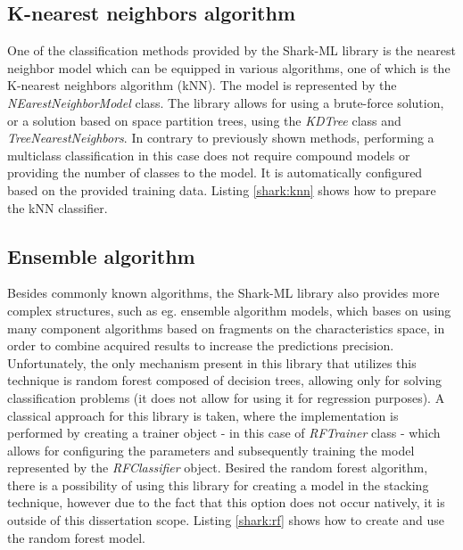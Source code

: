 
\subsection{K-nearest neighbors algorithm}

One of the classification methods provided by the Shark-ML library is the nearest neighbor model which can be equipped in various algorithms, one of which is the K-nearest neighbors algorithm (kNN). The model is represented by the 
\textit{NEarestNeighborModel} class. The library allows for using a brute-force solution, or a solution based on space partition trees, using the \textit{KDTree} class and \textit{TreeNearestNeighbors}. In contrary to previously shown methods, performing a multiclass classification in this case does not require compound models or providing the number of classes to the model. It is automatically configured based on the provided training data. Listing \ref{shark:knn} shows how to prepare the kNN classifier. 


\subsection{Ensemble algorithm}

Besides commonly known algorithms, the Shark-ML library also provides more complex structures, such as eg. ensemble algorithm models, which bases on using many component algorithms based on fragments on the characteristics space, in order to combine acquired results to increase the predictions precision. Unfortunately, the only mechanism present in this library that utilizes this technique is random forest composed of decision trees, allowing only for solving classification problems (it does not allow for using it for regression purposes). A classical approach for this library is taken, where the implementation is performed by creating a trainer object - in this case of \textit{RFTrainer} class - which allows for configuring the parameters and subsequently training the model represented by the \textit{RFClassifier} object. Besired the random forest algorithm, there is a possibility of using this library for creating a model in the stacking technique, however due to the fact that this option does not occur natively, it is outside of this dissertation scope. Listing \ref{shark:rf} shows how to create and use the random forest model. 

